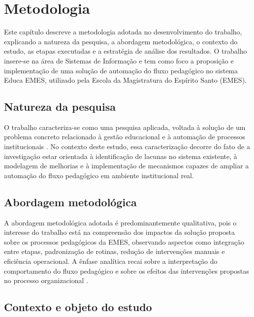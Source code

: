 %

\chapter{Metodologia}
\label{sec:metod}

Este capítulo descreve a metodologia adotada no desenvolvimento do
trabalho, explicando a natureza da pesquisa, a abordagem metodológica, o
contexto do estudo, as etapas executadas e a estratégia de análise dos
resultados. O trabalho insere-se na área de Sistemas de Informação e tem
como foco a proposição e implementação de uma solução de automação do
fluxo pedagógico no sistema Educa EMES, utilizado pela Escola da
Magistratura do Espírito Santo (EMES).

\section{Natureza da pesquisa}
\label{sec:metod:natureza}

O trabalho caracteriza-se como uma pesquisa aplicada, voltada à solução
de um problema concreto relacionado à gestão educacional e à automação
de processos institucionais \cite{CreswellCreswell2023}. No contexto deste
estudo, essa caracterização decorre do fato de a investigação estar orientada à
identificação de lacunas no sistema existente, à modelagem de melhorias
e à implementação de mecanismos capazes de ampliar a automação do fluxo
pedagógico em ambiente institucional real.

\section{Abordagem metodológica}
\label{sec:metod:abordagem}

A abordagem metodológica adotada é predominantemente qualitativa, pois o interesse do
trabalho está na compreensão dos impactos da solução proposta sobre os
processos pedagógicos da EMES, observando aspectos como integração entre
etapas, padronização de rotinas, redução de intervenções manuais e
eficiência operacional. A ênfase analítica recai sobre a interpretação
do comportamento do fluxo pedagógico e sobre os efeitos das
intervenções propostas no processo organizacional
\cite{CreswellCreswell2023}.

\section{Contexto e objeto do estudo}
\label{sec:metod:contexto}

